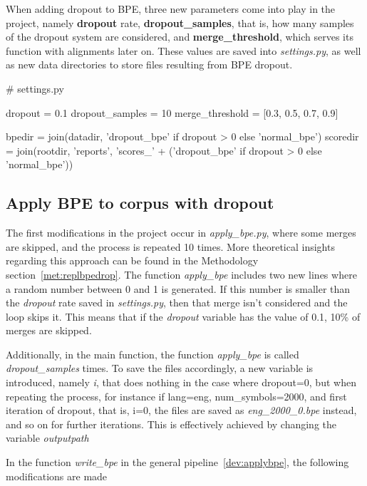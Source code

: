 When adding dropout to BPE, three new parameters come into play in the project, namely \textbf{dropout} rate, \textbf{dropout\_samples}, that is, how many samples of the dropout system are considered, and \textbf{merge\_threshold}, which serves its function with alignments later on. These values are saved into \emph{settings.py}, as well as new data directories to store files resulting from BPE dropout.

\begin{python}
# settings.py

dropout = 0.1
dropout_samples = 10
merge_threshold = [0.3, 0.5, 0.7, 0.9]

bpedir = join(datadir, 'dropout_bpe' if dropout > 0 else 'normal_bpe')
scoredir = join(rootdir, 'reports', 'scores_' + ('dropout_bpe' if dropout > 0 else 'normal_bpe'))
\end{python}

\subsection{Apply BPE to corpus with dropout}

The first modifications in the project occur in \emph{apply\_bpe.py}, where some merges are skipped, and the process is repeated 10 times. More theoretical insights regarding this approach can be found in the Methodology section~\ref{met:replbpedrop}. The function \emph{apply\_bpe} includes two new lines where a random number between 0 and 1 is generated. If this number is smaller than the \emph{dropout} rate saved in \emph{settings.py}, then that merge isn't considered and the loop skips it. This means that if the \emph{dropout} variable has the value of 0.1, 10\% of merges are skipped.

Additionally, in the main function, the function \emph{apply\_bpe} is called \emph{dropout\_samples} times. To save the files accordingly, a new variable is introduced, namely \emph{i}, that does nothing in the case where dropout=0, but when repeating the process, for instance if lang=eng, num\_symbols=2000, and first iteration of dropout, that is, i=0, the files are saved as \emph{eng\_2000\_0.bpe} instead, and so on for further iterations. This is effectively achieved by changing the variable \emph{outputpath}

In the function \emph{write\_bpe} in the general pipeline~\ref{dev:applybpe}, the following modifications are made

